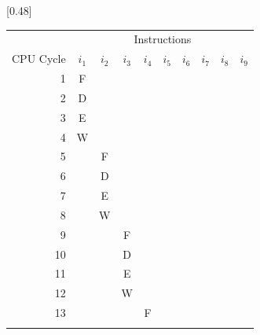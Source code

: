 \begin{table}
    \centering
    \parbox[b][0.8\textheight][s]{0.5\textwidth}{%
        \centering
        [0.48\textwidth]{%
            \scriptsize
            \begin{tabular}{rccccccccc} \toprule
                & \multicolumn{9}{c}{\fontsize{11pt}{9pt}\selectfont Instructions} \\
                \cmidrule{2-10}
                {\fontsize{11pt}{9pt}\selectfont CPU Cycle} & 
                {\fontsize{11pt}{9pt}\selectfont $i_1$} & 
                {\fontsize{11pt}{9pt}\selectfont $i_2$} & 
                {\fontsize{11pt}{9pt}\selectfont $i_3$} & 
                {\fontsize{11pt}{9pt}\selectfont $i_4$} & 
                {\fontsize{11pt}{9pt}\selectfont $i_5$} & 
                {\fontsize{11pt}{9pt}\selectfont $i_6$} & 
                {\fontsize{11pt}{9pt}\selectfont $i_7$} & 
                {\fontsize{11pt}{9pt}\selectfont $i_8$} & 
                {\fontsize{11pt}{9pt}\selectfont $i_9$} \\
                \midrule
                 1 & F &   &   &   &   &   &   &   &   \\ \rowcolor[gray]{.975}
                 2 & D &   &   &   &   &   &   &   &   \\
                 3 & E &   &   &   &   &   &   &   &   \\ \rowcolor[gray]{.975}
                 4 & W &   &   &   &   &   &   &   &   \\
                 5 &   & F &   &   &   &   &   &   &   \\ \rowcolor[gray]{.975}
                 6 &   & D &   &   &   &   &   &   &   \\
                 7 &   & E &   &   &   &   &   &   &   \\ \rowcolor[gray]{.975}
                 8 &   & W &   &   &   &   &   &   &   \\
                 9 &   &   & F &   &   &   &   &   &   \\ \rowcolor[gray]{.975}
                10 &   &   & D &   &   &   &   &   &   \\
                11 &   &   & E &   &   &   &   &   &   \\ \rowcolor[gray]{.975}
                12 &   &   & W &   &   &   &   &   &   \\
                13 &   &   &   & F &   &   &   &   &   \\ \rowcolor[gray]{.975}

\end{tabular}}}
\end{table}
